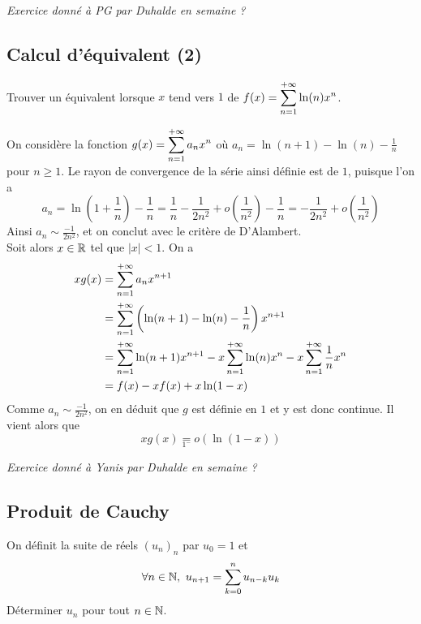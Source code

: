 \textit{Exercice donné à PG par Duhalde en semaine ?}
\subsection{Calcul d'équivalent (2)}
\begin{exo}
	Trouver un équivalent lorsque $x$ tend vers $1$ de $f(x)=\displaystyle\sum_{n=1}^{+\infty}\ln(n)x^n$.
\end{exo}

\begin{sol}
On considère la fonction $g(x)=\displaystyle\sum_{n=1}^{+\infty}a_nx^n$ où $a_n=\ln(n+1)-\ln(n)-\frac1n$ pour $n\geq 1$. Le rayon de convergence de la série ainsi définie est de $1$, puisque l'on a \[a_n=\ln\left(1+\frac1n\right)-\frac1n=\frac1n-\frac1{2n^2}+o\left(\frac1{n^2}\right)-\frac1n=-\frac1{2n^2}+o\left(\frac1{n^2}\right)\] 
Ainsi $a_n\sim\frac{-1}{2n^2}$, et on conclut avec le critère de D'Alambert. \\


Soit alors $x\in\mathbb{R}$ tel que $|x|<1$. On a 
\begin{align*}
	xg(x)&=\displaystyle\sum_{n=1}^{+\infty}a_nx^{n+1}\\
		&=\displaystyle\sum_{n=1}^{+\infty}\left(\ln(n+1)-\ln(n)-\frac1n\right)x^{n+1}\\
		&=\displaystyle\sum_{n=1}^{+\infty}\ln(n+1)x^{n+1}-x\displaystyle\sum_{n=1}^{+\infty}\ln(n)x^n-x\displaystyle\sum_{n=1}^{+\infty}\frac1nx^n\\
		&=f(x)-xf(x)+x\ln(1-x)
\end{align*}
Comme $a_n\sim\frac{-1}{2n^2}$, on en déduit que $g$ est définie en $1$ et y est donc continue. Il vient alors que \[xg(x)\underset{1^{-}}{=}o(\ln(1-x))\]
\end{sol}


\textit{Exercice donné à Yanis par Duhalde en semaine ?}
\subsection{Produit de Cauchy}
\begin{exo}
	On définit la suite de réels $(u_n)_n$ par $u_0=1$ et \[\forall n\in\N,\ u_{n+1}=\sum_{k=0}^nu_{n-k}u_k\]
	Déterminer $u_n$ pour tout $n\in\mathbb{N}$.
\end{exo}

